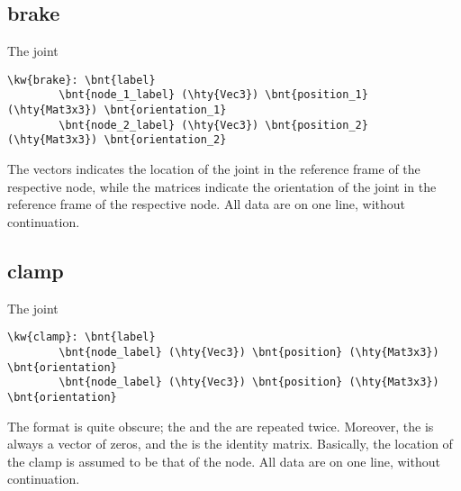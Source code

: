 \subsection{brake}
The  joint
\begin{Verbatim}[commandchars=\\\{\}]
    \kw{brake}: \bnt{label}
        \bnt{node_1_label} (\hty{Vec3}) \bnt{position_1} (\hty{Mat3x3}) \bnt{orientation_1}
        \bnt{node_2_label} (\hty{Vec3}) \bnt{position_2} (\hty{Mat3x3}) \bnt{orientation_2}
\end{Verbatim}
The  vectors indicates the location of the joint
in the reference frame of the respective node,
while the  matrices indicate the orientation of the joint
in the reference frame of the respective node.
All data are on one line, without continuation.

\subsection{clamp}
The  joint
\begin{Verbatim}[commandchars=\\\{\}]
    \kw{clamp}: \bnt{label}
        \bnt{node_label} (\hty{Vec3}) \bnt{position} (\hty{Mat3x3}) \bnt{orientation}
        \bnt{node_label} (\hty{Vec3}) \bnt{position} (\hty{Mat3x3}) \bnt{orientation}
\end{Verbatim}
The format is quite obscure; the  and the 
are repeated twice.
Moreover, the  is always a vector of zeros,
and the  is the identity matrix.
Basically, the location of the clamp is assumed to be that of the node.
All data are on one line, without continuation.

